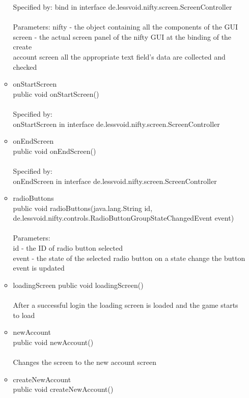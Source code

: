 \documentclass[letterpaper]{article}
\begin{document}
\begin{itemize}
\begin{itemize}
												Specified by:
												bind in interface de.lessvoid.nifty.screen.ScreenController \\ \\
												Parameters:
												nifty - the object containing all the components of the GUI \\
												screen - the actual screen panel of the nifty GUI at the binding of the create \\ account screen all the appropriate text field's data are collected and checked
										\item	onStartScreen \\
												public void onStartScreen() \\ \\
												Specified by: \\
												onStartScreen in interface de.lessvoid.nifty.screen.ScreenController
										\item	onEndScreen \\
												public void onEndScreen() \\ \\
												Specified by: \\
												onEndScreen in interface de.lessvoid.nifty.screen.ScreenController
										\item	radioButtons \\
												public void radioButtons(java.lang.String id, de.lessvoid.nifty.controls.RadioButtonGroupStateChangedEvent event) \\ \\
												Parameters: \\
												id - the ID of radio button selected \\
												event - the state of the selected radio button on a state change the button event is updated
										\item	loadingScreen
												public void loadingScreen() \\ \\
												After a successful login the loading screen is loaded and the game starts to load
										\item	newAccount \\
												public void newAccount() \\ \\
												Changes the screen to the new account screen
										\item	createNewAccount \\
												public void createNewAccount() \\ \\

\end{itemize}
\end{itemize}
\end{document}
